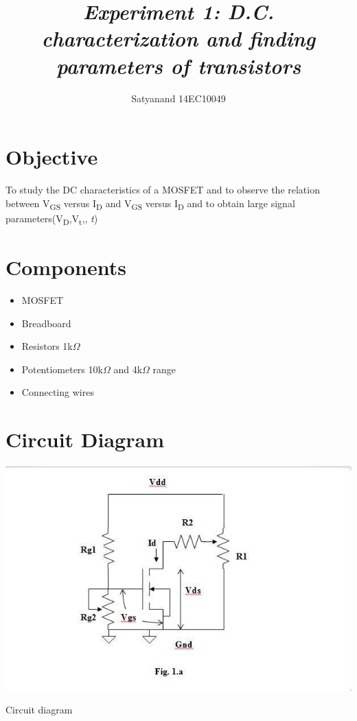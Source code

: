 \documentclass[12pt]{article}
\title{{\it \textbf{Experiment 1:\hspace{0.5cm} D.C. characterization and finding parameters of transistors}\/} }
\author
{Satyanand 14EC10049\\
\normalize{Rohit Kumar 14EC10043}
}
\date{}
\renewcommand{\baselinestretch}{0.5}
\begin{document}
 


\baselineskip14pt


\maketitle 








\renewcommand{\baselinestretch}{0.5} 

\section*{Objective}

To study the DC characteristics of a MOSFET and to observe the relation between V\textsubscript{GS} versus I\textsubscript{D} and V\textsubscript{GS} versus I\textsubscript{D} and to obtain large signal parameters(V\textsubscript{D},V\textsubscript{t},\lambda,
\textit{t})

\section*{Components}
\begin{itemize}
    \item MOSFET
    \item Breadboard%
    \item Resistors 1k$\Omega$
    \item Potentiometers 10k$\Omega$ and  4k$\Omega$  range
    \item Connecting wires
\end{itemize}

\section*{Circuit Diagram}
\includegraphics{ckt.jpg}
  \caption{Circuit diagram}
  
\end{document}
